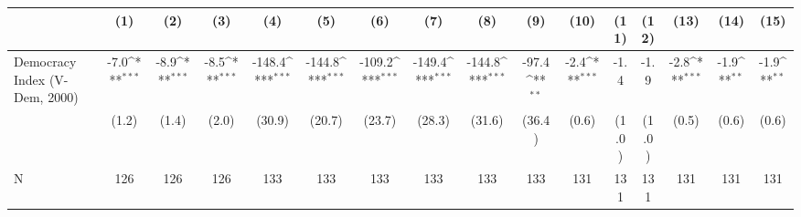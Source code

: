 {
\def\sym#1{\ifmmode^{#1}\else\(^{#1}\)\fi}
\begin{tabular}{l*{15}{c}}
\hline\hline
                    &\multicolumn{1}{c}{(1)}         &\multicolumn{1}{c}{(2)}         &\multicolumn{1}{c}{(3)}         &\multicolumn{1}{c}{(4)}         &\multicolumn{1}{c}{(5)}         &\multicolumn{1}{c}{(6)}         &\multicolumn{1}{c}{(7)}         &\multicolumn{1}{c}{(8)}         &\multicolumn{1}{c}{(9)}         &\multicolumn{1}{c}{(10)}         &\multicolumn{1}{c}{(11)}         &\multicolumn{1}{c}{(12)}         &\multicolumn{1}{c}{(13)}         &\multicolumn{1}{c}{(14)}         &\multicolumn{1}{c}{(15)}         \\
\hline
Democracy Index (V-Dem, 2000)&        -7.0\sym{***}&        -8.9\sym{***}&        -8.5\sym{***}&      -148.4\sym{***}&      -144.8\sym{***}&      -109.2\sym{***}&      -149.4\sym{***}&      -144.8\sym{***}&       -97.4\sym{**} &        -2.4\sym{***}&        -1.4         &        -1.9         &        -2.8\sym{***}&        -1.9\sym{**} &        -1.9\sym{**} \\
                    &       (1.2)         &       (1.4)         &       (2.0)         &      (30.9)         &      (20.7)         &      (23.7)         &      (28.3)         &      (31.6)         &      (36.4)         &       (0.6)         &       (1.0)         &       (1.0)         &       (0.5)         &       (0.6)         &       (0.6)         \\
\hline
N                   &         126         &         126         &         126         &         133         &         133         &         133         &         133         &         133         &         133         &         131         &         131         &         131         &         131         &         131         &         131         \\
\hline\hline
\end{tabular}
}
